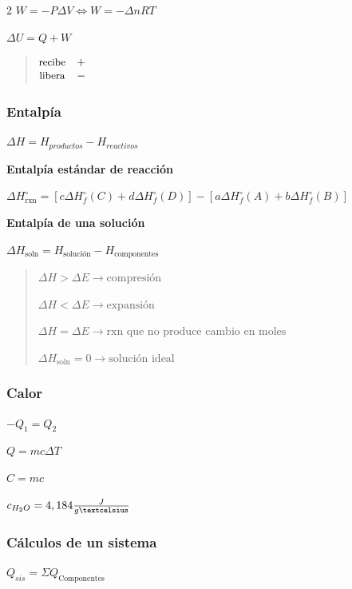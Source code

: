 \begin {multicols}{2}
\(W=-P{\Delta}V\Leftrightarrow W=-{\Delta}nRT\)

\({\Delta}U=Q+W\)

\begin{quote}
\(\begin{matrix}\text{\small{recibe}} & + \\ \text{\small{libera}} & -\end{matrix}\)
\end{quote}

\hypertarget{entalpuxeda}{%
\subsubsection{Entalpía}\label{entalpuxeda}}

\({\Delta}H=H_{productos}-H_{reactivos}\)

\textbf{Entalpía estándar de reacción}

\({\Delta}H_{\text{rxn}}^\circ=[c{\Delta}H_{f}^\circ(C)+d{\Delta}H_{f}^\circ(D)]-[a{\Delta}H_{f}^\circ(A)+b{\Delta}H_{f}^\circ(B)]\)

\textbf{Entalpía de una solución}

\({\Delta}H_{\text{soln}}=H_{\text{solución}}-H_{\text{componentes}}\)

\begin{quote}
\({\Delta}H>{\Delta}E→\text{compresión}\)

\({\Delta}H<{\Delta}E→\text{expansión}\)

\({\Delta}H={\Delta}E→\text{rxn que no produce cambio en moles}\)

\({\Delta}H_{\text{soln}}=0→\text{solución ideal}\)
\end{quote}

\hypertarget{calor}{%
\subsubsection{Calor}\label{calor}}

\(-Q_1=Q_2\)

\(Q=mc{\Delta}T\)

\(C=mc\)

\(c_{H_{2}O}=4,184\frac{J}{g\textcelsius}\)

\hypertarget{cuxe1lculos-de-un-sistema}{%
\subsubsection{Cálculos de un sistema}\label{cuxe1lculos-de-un-sistema}}

\(Q_{sis}={\Sigma}Q_{\text{Componentes}}\)


\end{multicols}
